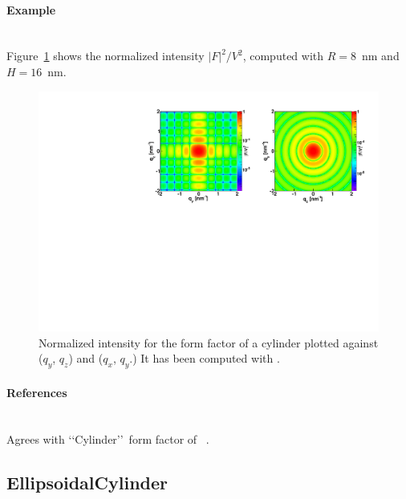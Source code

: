 \paragraph{Example}\strut\\
Figure~\ref{fig:FFcylinderEx} shows the normalized intensity
$|F|^2/V^2$, computed with $R=8$~nm and \mbox{$H=16$~nm.}
\begin{figure}[h]
\begin{center}
\includegraphics[angle=-90,width=\textwidth]{fig/ff/figffcylinder.pdf}
\end{center}
\caption{Normalized intensity for the form factor of a cylinder plotted against ($q_y$, $q_z$) and  ($q_x$, $q_y$.) It
has been  computed with .}
\label{fig:FFcylinderEx}
\end{figure}

\paragraph{References}\strut\\
Agrees with \lq\lq Cylinder\rq\rq\ form factor of \IsGISAXS~\cite{Laz02}.

\clearpage
\subsection{EllipsoidalCylinder} \label{sec:EllipsoidalCylinder} 

